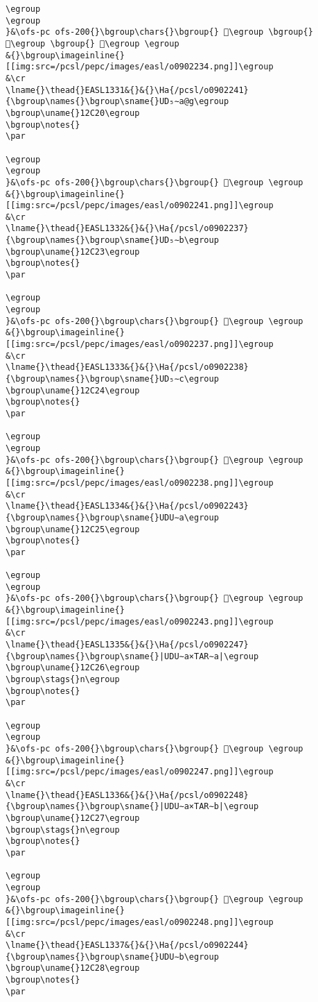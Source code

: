 \begin{verbatim}
\egroup
\egroup
}&\ofs-pc ofs-200{}\bgroup\chars{}\bgroup{} 𒰟\egroup \bgroup{} 𒰡\egroup \bgroup{} 𒰢\egroup \egroup
&{}\bgroup\imageinline{}[[img:src=/pcsl/pepc/images/easl/o0902234.png]]\egroup
&\cr
\lname{}\thead{}EASL1331&{}&{}\Ha{/pcsl/o0902241}{\bgroup\names{}\bgroup\sname{}UD₅∼a@g\egroup
\bgroup\uname{}12C20\egroup
\bgroup\notes{}
\par 

\egroup
\egroup
}&\ofs-pc ofs-200{}\bgroup\chars{}\bgroup{} 𒰠\egroup \egroup
&{}\bgroup\imageinline{}[[img:src=/pcsl/pepc/images/easl/o0902241.png]]\egroup
&\cr
\lname{}\thead{}EASL1332&{}&{}\Ha{/pcsl/o0902237}{\bgroup\names{}\bgroup\sname{}UD₅∼b\egroup
\bgroup\uname{}12C23\egroup
\bgroup\notes{}
\par 

\egroup
\egroup
}&\ofs-pc ofs-200{}\bgroup\chars{}\bgroup{} 𒰣\egroup \egroup
&{}\bgroup\imageinline{}[[img:src=/pcsl/pepc/images/easl/o0902237.png]]\egroup
&\cr
\lname{}\thead{}EASL1333&{}&{}\Ha{/pcsl/o0902238}{\bgroup\names{}\bgroup\sname{}UD₅∼c\egroup
\bgroup\uname{}12C24\egroup
\bgroup\notes{}
\par 

\egroup
\egroup
}&\ofs-pc ofs-200{}\bgroup\chars{}\bgroup{} 𒰤\egroup \egroup
&{}\bgroup\imageinline{}[[img:src=/pcsl/pepc/images/easl/o0902238.png]]\egroup
&\cr
\lname{}\thead{}EASL1334&{}&{}\Ha{/pcsl/o0902243}{\bgroup\names{}\bgroup\sname{}UDU∼a\egroup
\bgroup\uname{}12C25\egroup
\bgroup\notes{}
\par 

\egroup
\egroup
}&\ofs-pc ofs-200{}\bgroup\chars{}\bgroup{} 𒰥\egroup \egroup
&{}\bgroup\imageinline{}[[img:src=/pcsl/pepc/images/easl/o0902243.png]]\egroup
&\cr
\lname{}\thead{}EASL1335&{}&{}\Ha{/pcsl/o0902247}{\bgroup\names{}\bgroup\sname{}|UDU∼a×TAR∼a|\egroup
\bgroup\uname{}12C26\egroup
\bgroup\stags{}n\egroup
\bgroup\notes{}
\par 

\egroup
\egroup
}&\ofs-pc ofs-200{}\bgroup\chars{}\bgroup{} 𒰦\egroup \egroup
&{}\bgroup\imageinline{}[[img:src=/pcsl/pepc/images/easl/o0902247.png]]\egroup
&\cr
\lname{}\thead{}EASL1336&{}&{}\Ha{/pcsl/o0902248}{\bgroup\names{}\bgroup\sname{}|UDU∼a×TAR∼b|\egroup
\bgroup\uname{}12C27\egroup
\bgroup\stags{}n\egroup
\bgroup\notes{}
\par 

\egroup
\egroup
}&\ofs-pc ofs-200{}\bgroup\chars{}\bgroup{} 𒰧\egroup \egroup
&{}\bgroup\imageinline{}[[img:src=/pcsl/pepc/images/easl/o0902248.png]]\egroup
&\cr
\lname{}\thead{}EASL1337&{}&{}\Ha{/pcsl/o0902244}{\bgroup\names{}\bgroup\sname{}UDU∼b\egroup
\bgroup\uname{}12C28\egroup
\bgroup\notes{}
\par 


\end{verbatim}
